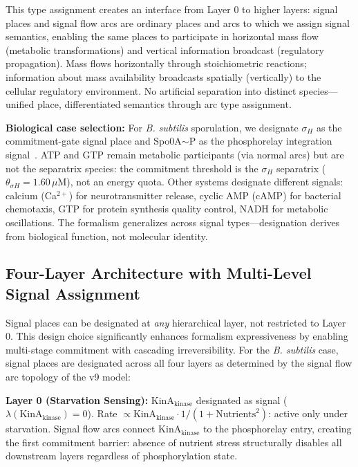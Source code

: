 \documentclass[10pt,letterpaper]{article}
\begin{document}
This type assignment creates an interface from Layer 0 to higher layers: signal places and signal flow arcs are ordinary places and arcs to which we assign signal semantics, enabling the same places to participate in horizontal mass flow (metabolic transformations) and vertical information broadcast (regulatory propagation). Mass flows horizontally through stoichiometric reactions; information about mass availability broadcasts spatially (vertically) to the cellular regulatory environment. No artificial separation into distinct species---unified place, differentiated semantics through arc type assignment.

\textbf{Biological case selection:} For \textit{B. subtilis} sporulation, we designate $\sigma_H$ as the commitment-gate signal place and Spo0A$\sim$P as the phosphorelay integration signal~\cite{fujita2005}. ATP and GTP remain metabolic participants (via normal arcs) but are not the separatrix species: the commitment threshold is the $\sigma_H$ separatrix ($\theta_{\sigma H} = 1.60\,\mu$M), not an energy quota. Other systems designate different signals: calcium (Ca$^{2+}$) for neurotransmitter release, cyclic AMP (cAMP) for bacterial chemotaxis, GTP for protein synthesis quality control, NADH for metabolic oscillations. The formalism generalizes across signal types---designation derives from biological function, not molecular identity.

\subsection{Four-Layer Architecture with Multi-Level Signal Assignment}\label{sec:four_layer}

Signal places can be designated at \textit{any} hierarchical layer, not restricted to Layer 0. This design choice significantly enhances formalism expressiveness by enabling multi-stage commitment with cascading irreversibility. For the \textit{B. subtilis} case, signal places are designated across all four layers as determined by the signal flow arc topology of the v9 model:

\vspace{3pt}
\noindent\textbf{Layer 0 (Starvation Sensing):} KinA$_{\text{kinase}}$ designated as signal ($\lambda(\text{KinA}_{\text{kinase}}) = 0$). Rate $\propto \text{KinA}_{\text{kinase}} \cdot 1/(1+\text{Nutrients}^2)$: active only under starvation. Signal flow arcs connect KinA$_{\text{kinase}}$ to the phosphorelay entry, creating the first commitment barrier: absence of nutrient stress structurally disables all downstream layers regardless of phosphorylation state.
\end{document}
